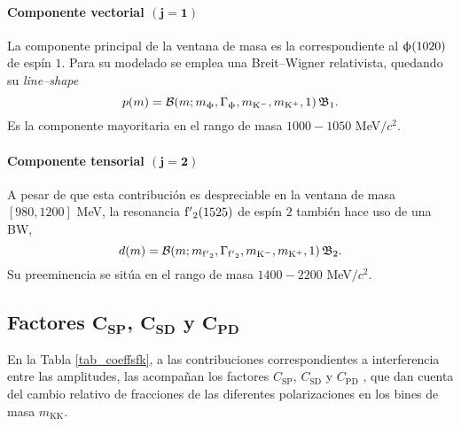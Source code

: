 \paragraph{Componente vectorial $\bm{(j=1)}$}
La componente principal de la ventana de masa es la correspondiente al $\upphi(1020)$ de espín $1$. Para su modelado se emplea una Breit--Wigner relativista, quedando su \emph{line--shape}
\begin{equation}
	p(m) = \mathcal{B}(m;m_{\upphi},\Gamma_{\upphi},m_{\mathrm{K}{}^{-}},m_{\mathrm{K}{}^{+}},1) \, \mathfrak{B}_1.
\end{equation}
Es la componente mayoritaria en el rango de masa $1000-1050$ MeV$/c^2$.


\paragraph{Componente tensorial $\bm{(j=2)}$}
A pesar de que esta contribución es despreciable en la ventana de masa $[980,1200]$ MeV, la resonancia $\mathrm{f'}_2(1525)$ de espín $2$ también hace uso de una BW,
\begin{equation}
	d(m) = \mathcal{B}(m;m_{\mathrm{f'}_2},\Gamma_{\mathrm{f'}_2},m_{\mathrm{K}{}^{-}},m_{\mathrm{K}{}^{+}},1) \, \mathfrak{B}_2.
\end{equation}
Su preeminencia se sitúa en el rango de masa $1400-2200$ MeV$/c^2$.





\subsection[ee]{Factores 
$\bm{C_{\text{SP}}}$, $\bm{C_{\text{SD}}}$ y $\bm{C_{\text{PD}}}$
}

\label{sec_factorescspcspdcssd}

En la Tabla \ref{tab_coeffsfk}, a las contribuciones correspondientes a interferencia entre las amplitudes, las acompañan los factores $C_{\text{SP}}$, $C_{\text{SD}}$ y $C_{\text{PD}}$ , que dan cuenta del cambio relativo de fracciones de las diferentes polarizaciones en los bines de masa $m_{\text{KK}}$.

